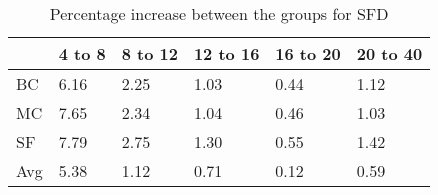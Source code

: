 \begin{table}[H]
	\centering
	\begin{tabular}{|l|lllll|}\hline
		& 4 to 8 & 8 to 12 & 12 to 16 & 16 to 20 & 20 to 40 \\ \hline
		BC 	& 6.16	& 2.25	& 1.03	& 0.44	& 1.12 \\
		MC  & 7.65	& 2.34	& 1.04	& 0.46	& 1.03 \\
		SF  & 7.79	& 2.75	& 1.30	& 0.55	& 1.42 \\
		Avg	& 5.38	& 1.12	& 0.71	& 0.12	& 0.59 \\ \hline
	\end{tabular}
	\caption{Percentage increase between the groups for SFD}
	\label{tbl:sfd}
\end{table}